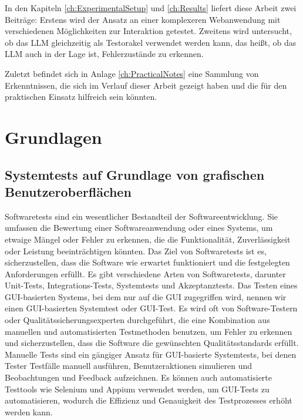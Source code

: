 In den Kapiteln \ref{ch:ExperimentalSetup} und \ref{ch:Results} liefert diese Arbeit zwei Beiträge:
Erstens wird der Ansatz an einer komplexeren Webanwendung mit verschiedenen Möglichkeiten zur Interaktion getestet.
Zweitens wird untersucht, ob das LLM gleichzeitig als Testorakel verwendet werden kann, das heißt, ob das LLM auch in der Lage ist, Fehlerzustände zu erkennen.


Zuletzt befindet sich in Anlage \ref{ch:PracticalNotes} eine Sammlung von Erkenntnissen, die sich im Verlauf dieser Arbeit gezeigt haben und die für den praktischen Einsatz hilfreich sein könnten.



\chapter{Grundlagen}
\label{ch:Foundations}

\section{Systemtests auf Grundlage von grafischen Benutzeroberflächen}
\label{sec:Foundations:GUIBasedSystemTests}
Softwaretests sind ein wesentlicher Bestandteil der Softwareentwicklung.
Sie umfassen die Bewertung einer Softwareanwendung oder eines Systems, um etwaige Mängel oder Fehler zu erkennen, die die Funktionalität, Zuverlässigkeit oder Leistung beeinträchtigen könnten.
Das Ziel von Softwaretests ist es, sicherzustellen, dass die Software wie erwartet funktioniert und die festgelegten Anforderungen erfüllt.
Es gibt verschiedene Arten von Softwaretests, darunter Unit-Tests, Integrations-Tests, Systemtests und Akzeptanztests.
Das Testen eines GUI-basierten Systems, bei dem nur auf die GUI zugegriffen wird, nennen wir einen GUI-basierten Systemtest oder GUI-Test.
Es wird oft von Software-Testern oder Qualitätssicherungsexperten durchgeführt, die eine Kombination aus manuellen und automatisierten Testmethoden benutzen, um Fehler zu erkennen und sicherzustellen, dass die Software die gewünschten Qualitätsstandards erfüllt.
Manuelle Tests sind ein gängiger Ansatz für GUI-basierte Systemtests, bei denen Tester Testfälle manuell ausführen, Benutzeraktionen simulieren und Beobachtungen und Feedback aufzeichnen.
Es können auch automatisierte Testtools wie Selenium und Appium verwendet werden, um GUI-Tests zu automatisieren, wodurch die Effizienz und Genauigkeit des Testprozesses erhöht werden kann.


